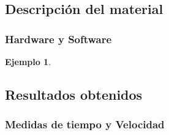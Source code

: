\documentclass{beamer}
\newtheorem{ejemplo}{Ejemplo}
\begin{document}

\subsection{Descripción del material}
\begin{frame}
\frametitle{Hardware y Software}

\begin{ejemplo}
  \begin{enumerate}

      
  \end{enumerate}
\end{ejemplo}

\end{frame}

\subsection{Resultados obtenidos}
\begin{frame}
\frametitle{Medidas de tiempo y Velocidad}




\end{frame}
\begin{frame}

\end{frame}
\end{document}
